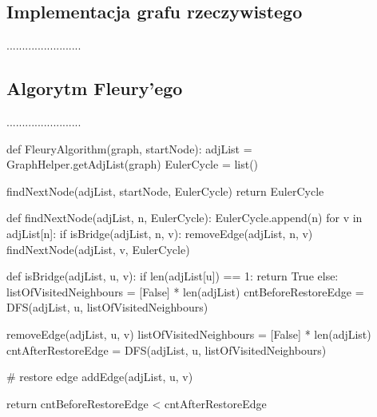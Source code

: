 \documentclass[a4paper, 12pt, twoside, openright]{article}
\begin{document}
\subsection{Implementacja grafu rzeczywistego}
\indent\par
........................

\subsection{Algorytm Fleury’ego}
\indent\par
........................

\begin{algorithm}[caption={\textit{FleuryAlgorithm} wyszukujący ścieżkę w grafie nieskierowanym}, label={makeeulerianDG}]
def FleuryAlgorithm(graph, startNode):
	adjList = GraphHelper.getAdjList(graph)
	EulerCycle = list()
	
	findNextNode(adjList, startNode, EulerCycle)
	return EulerCycle
\end{algorithm}

\begin{algorithm}[caption={\textit{findNextNode} rekurencyjna funkcja pomocnicza dla \textit{FleuryAlgorithm} }, label={makeeulerianDG}]
def findNextNode(adjList, n, EulerCycle):
	EulerCycle.append(n)
	for v in adjList[n]:
		if isBridge(adjList, n, v):
			removeEdge(adjList, n, v)
			findNextNode(adjList, v, EulerCycle)
\end{algorithm}

\begin{algorithm}[caption={\textit{findNextNode} rekurencyjna funkcja pomocnicza dla \textit{FleuryAlgorithm} }, label={makeeulerianDG}]
def isBridge(adjList, u, v):
	if len(adjList[u]) == 1:
		return True
	else:
		listOfVisitedNeighbours = [False] * len(adjList)
		cntBeforeRestoreEdge = DFS(adjList, u, listOfVisitedNeighbours)
		
		removeEdge(adjList, u, v)
		listOfVisitedNeighbours = [False] * len(adjList)
		cntAfterRestoreEdge = DFS(adjList, u, listOfVisitedNeighbours)
		
		# restore edge
		addEdge(adjList, u, v)
		
		return cntBeforeRestoreEdge < cntAfterRestoreEdge

\end{algorithm}
\end{document}
